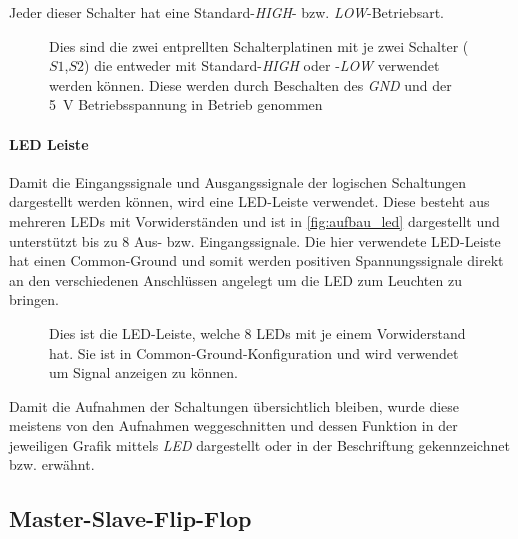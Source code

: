 \documentclass[12pt,english,ngerman]{scrartcl}
\begin{document}
Jeder dieser Schalter hat eine Standard-\textit{HIGH}- bzw.
\textit{LOW}-Betriebsart.

\begin{figure}[H]
  \centering
  \caption{Dies sind die zwei entprellten Schalterplatinen mit je zwei Schalter
    ($S1$,$S2$) die entweder mit Standard-\textit{HIGH} oder -\textit{LOW} verwendet
    werden können. Diese werden durch Beschalten des \textit{GND} und der \SI{5}{\volt}
    Betriebsspannung in Betrieb genommen}
  \label{fig:aufbau_schalter}
\end{figure}


\paragraph{LED Leiste}
Damit die Eingangssignale und Ausgangssignale der logischen Schaltungen
dargestellt werden können, wird eine LED-Leiste verwendet. Diese besteht aus
mehreren LEDs mit Vorwiderständen und ist in \autoref{fig:aufbau_led} dargestellt und
unterstützt bis zu 8 Aus- bzw. Eingangssignale. Die hier verwendete LED-Leiste
hat einen Common-Ground und somit werden positiven Spannungssignale direkt an den
verschiedenen Anschlüssen angelegt um die LED zum Leuchten zu bringen.

\begin{figure}[H]
  \centering
  \caption{Dies ist die LED-Leiste, welche 8 LEDs mit je einem Vorwiderstand
  hat. Sie ist in Common-Ground-Konfiguration und wird verwendet um Signal
  anzeigen zu können.}
  \label{fig:aufbau_led}
\end{figure}

Damit die Aufnahmen der Schaltungen übersichtlich bleiben, wurde diese meistens
von den Aufnahmen weggeschnitten und dessen Funktion in der jeweiligen Grafik
mittels \textit{LED} dargestellt oder in der Beschriftung gekennzeichnet bzw.
erwähnt.


\subsection{Master-Slave-Flip-Flop}


\end{document}

